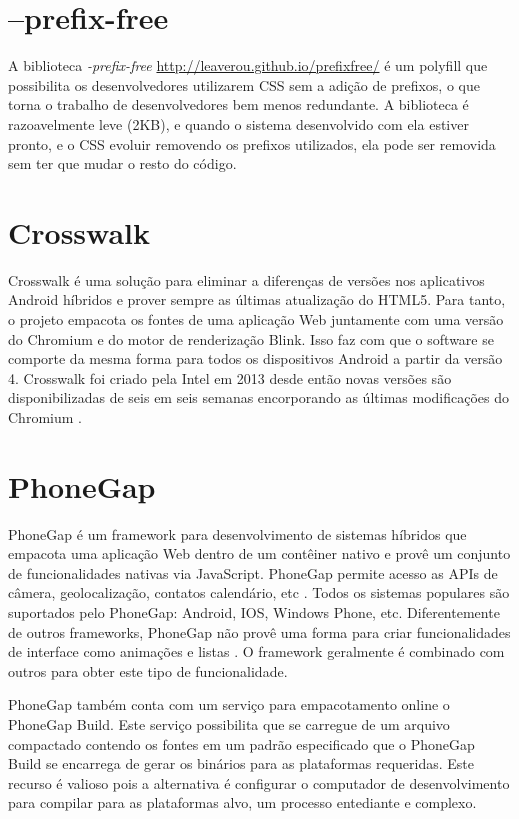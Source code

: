 \section{--prefix-free}

A biblioteca \textit{-prefix-free} \url{http://leaverou.github.io/prefixfree/}
é um polyfill que possibilita os desenvolvedores utilizarem CSS sem
a adição de prefixos, o que torna o trabalho de desenvolvedores bem
menos redundante. A biblioteca é razoavelmente leve (2KB), e quando o
sistema desenvolvido com ela estiver pronto, e o CSS evoluir removendo os
prefixos utilizados, ela pode ser removida sem ter que mudar o resto do código.

\section{Crosswalk} \label{crosswalk}

Crosswalk é uma solução para eliminar a diferenças de versões nos
aplicativos Android híbridos e prover sempre as últimas atualização
do HTML5. Para tanto, o projeto empacota os fontes de uma aplicação
Web juntamente com uma versão do Chromium e do motor de renderização
Blink. Isso faz com que o software se comporte da mesma forma para todos
os dispositivos Android a partir da versão 4. Crosswalk foi criado
pela Intel em 2013 desde então novas versões são disponibilizadas
de seis em seis semanas encorporando as últimas modificações do Chromium
\autocite{crosswalkProject}.

\section{PhoneGap}

PhoneGap é um framework para desenvolvimento de sistemas híbridos que
empacota uma aplicação Web dentro de um contêiner nativo e provê um
conjunto de funcionalidades nativas via JavaScript. PhoneGap permite
acesso as APIs de câmera, geolocalização, contatos calendário,
etc \autocite[p. 3]{crossPlatformAppsAnimations}. Todos os sistemas
populares são suportados pelo PhoneGap: Android, IOS, Windows Phone,
etc. Diferentemente de outros frameworks, PhoneGap não provê uma
forma para criar funcionalidades de interface como animações e listas
\autocite[p. 15]{viabilityBusinessApplications}. O framework 
geralmente é combinado com outros para obter este tipo de funcionalidade.

PhoneGap também conta com um serviço para empacotamento online o
PhoneGap Build. Este serviço possibilita que se carregue de um arquivo
compactado contendo os fontes em um padrão especificado que o PhoneGap
Build se encarrega de gerar os binários para as plataformas requeridas.
Este recurso é valioso pois a alternativa é configurar o computador
de desenvolvimento para compilar para as plataformas alvo, um processo
entediante e complexo.

